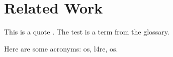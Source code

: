 \chapter{Related Work}
\label{chap:related-work}

This is a quote \cite{sel4-sched-cntxt-cap-18}.
The \gls{test} is a term from the glossary.

Here are some acronyms: \gls{os}, \gls{l4re}, \gls{os}.


